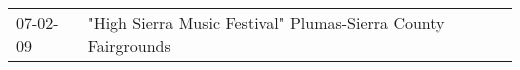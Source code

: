 \begin{supertabular}{p{0.07\textwidth}p{0.23\textwidth}}
 07-02-09 &  "High Sierra Music Festival" Plumas-Sierra County Fairgrounds \\
\end{supertabular}
